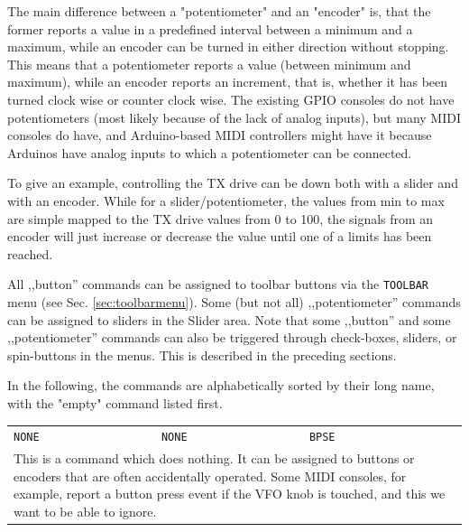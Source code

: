 \documentclass[12pt]{book}
\def\bltt#1{\texttt{\color{blue}#1}}
\begin{document}
The main difference between a "potentiometer" and an "encoder" is, that the former reports a
value in a predefined interval between a minimum and a maximum,
while
an encoder can be turned in either direction without stopping. This means that a potentiometer
reports a value (between minimum and maximum), while an encoder reports an increment,
that is, whether it has been turned clock wise or counter clock wise.
The existing GPIO consoles do not have potentiometers (most likely because of the lack of analog inputs),
but many MIDI consoles do have, and Arduino-based MIDI controllers might have it because Arduinos have
analog inputs to which a potentiometer can be connected.

To give an example, controlling the TX drive can be down both with a slider and with an encoder. While for
a slider/potentiometer, the values from min to max are simple mapped to the TX drive values from 0 to 100,
the signals from an encoder will just increase or decrease the value until one of a limits has been reached.

All ,,button'' commands can be assigned to toolbar buttons via the \bltt{TOOLBAR} menu
(see Sec. \ref{sec:toolbarmenu}). Some (but not all) ,,potentiometer'' commands can
be assigned to sliders in the Slider area.
Note that some ,,button'' and some ,,potentiometer'' commands
can also be triggered through check-boxes, sliders, or spin-buttons in the menus.
This is described in the preceding sections.

In the following, the commands are alphabetically sorted by their long name, with the "empty" command listed
first.

\renewcommand{\belowrulesep}{0pt}
\renewcommand{\aboverulesep}{0pt}
\def\phcommand#1#2#3#4{
\begin{center}
\begin{tabular}{|p{7cm}|p{3cm}|p{1cm}|}
\toprule
\bltt{\large #1} & \texttt{\large #2} & \texttt{\large #3}$\phantom{\Big|}$ \\\cline{1-3}
\multicolumn{3}{|p{\textwidth}|}{#4} \\
\bottomrule
\end{tabular}
\end{center}
}


\phcommand{NONE}{NONE}{BPSE}{This is a command which does nothing. It can be assigned to buttons or enco\-ders
that
are often accidentally operated. Some MIDI consoles, for example, report a button press event if the VFO
knob is touched, and this we want to be able to ignore.}
\end{document}
